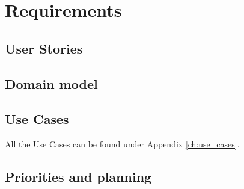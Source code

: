\chapter{Requirements}\label{ch:requirements}

\section{User Stories}


\section{Domain model}


\section{Use Cases}

All the Use Cases can be found under Appendix \autoref{ch:use_cases}.

\section{Priorities and planning}\label{sec:prio_and_planning}




